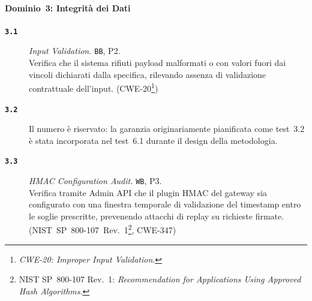 \paragraph{Dominio~3: Integrità dei Dati}
\begin{description}
      \item[\textbf{\texttt{3.1}}]
            \textit{Input Validation.} \texttt{BB}, P2.\\
            Verifica che il sistema rifiuti payload malformati o con valori fuori dai vincoli dichiarati dalla specifica, rilevando assenza di validazione contrattuale dell'input.
            (\gls{CWE}-20\footnote{\textit{CWE-20: Improper Input Validation}.})

      \item[\textbf{\texttt{3.2}}]
            Il numero è riservato: la garanzia originariamente pianificata come test~3.2 è stata incorporata nel test~6.1 durante il design della metodologia.

      \item[\textbf{\texttt{3.3}}]
            \textit{HMAC Configuration Audit.} \texttt{WB}, P3.\\
            Verifica tramite Admin \gls{API} che il plugin \gls{HMAC} del gateway sia configurato con una finestra temporale di validazione del timestamp entro le soglie prescritte, prevenendo attacchi di replay su richieste firmate.
            (\gls{NIST}~SP~800-107~Rev.~1\footnote{\gls{NIST} SP~800-107 Rev.~1: \textit{Recommendation for Applications Using Approved Hash Algorithms}.}, \gls{CWE}-347)
\end{description}


